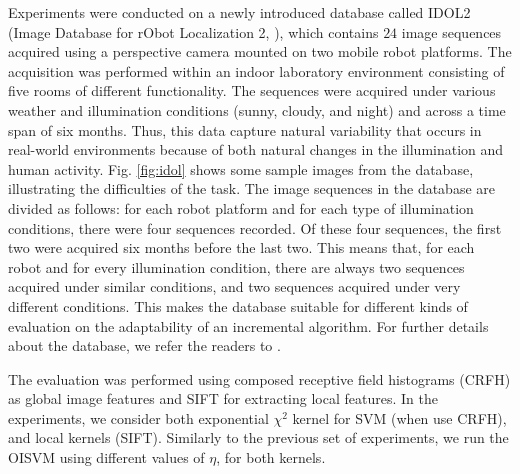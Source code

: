Experiments were conducted on a newly introduced database called IDOL2
(Image Database for rObot Localization 2, \cite{luo:idol2}), which
contains $24$ image sequences acquired using a perspective camera
mounted on two mobile robot platforms. The acquisition was performed
within an indoor laboratory environment consisting of five rooms of
different functionality. The sequences were acquired under various
weather and illumination conditions (sunny, cloudy, and night) and
across a time span of six months. Thus, this data capture natural
variability that occurs in real-world environments because of both
natural changes in the illumination and human
activity. Fig. \ref{fig:idol} shows some sample images from the
database, illustrating the difficulties of the task.  The image
sequences in the database are divided as follows: for each robot
platform and for each type of illumination conditions, there were four
sequences recorded. Of these four sequences, the first two were
acquired six months before the last two. This means that, for each
robot and for every illumination condition, there are always two
sequences acquired under similar conditions, and two sequences
acquired under very different conditions. This makes the database
suitable for different kinds of evaluation on the adaptability of an
incremental algorithm. For further details about the database, we
refer the readers to \cite{luo:idol2}.

The evaluation was performed using composed receptive field histograms
(CRFH) \cite{linde:icpr04} as global image features and SIFT
\cite{lowe99object} for extracting local features. In the experiments,
we consider both exponential $\chi^2$ kernel for SVM (when use CRFH),
and local kernels \cite{wallraven:iccv03} (SIFT).  Similarly to the
previous set of experiments, we run the OISVM using different values
of $\eta$, for both kernels.

